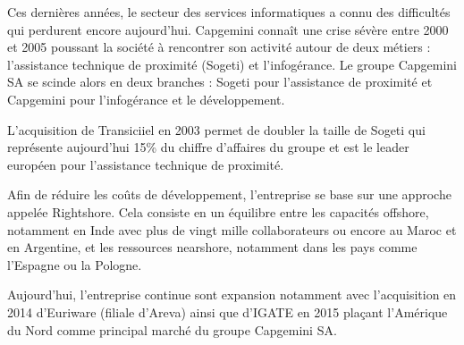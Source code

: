     Ces dernières années, le secteur des services informatiques a connu des difficultés qui perdurent encore aujourd'hui. Capgemini connaît une crise sévère entre 2000 et 2005 poussant la société à rencontrer son activité autour de deux métiers : l'assistance technique de proximité (Sogeti) et l'infogérance. Le groupe Capgemini SA se scinde alors en deux branches : Sogeti pour l'assistance de proximité et Capgemini pour l'infogérance et le développement.
    
    L'acquisition de Transiciiel en 2003 permet de doubler la taille de Sogeti qui représente aujourd'hui 15\% du chiffre d'affaires du groupe et est le leader européen pour l'assistance technique de proximité.
    
    Afin de réduire les coûts de développement, l'entreprise se base sur une approche appelée Rightshore. Cela consiste en un équilibre entre les capacités offshore, notamment en Inde avec plus de vingt mille collaborateurs ou encore au Maroc et en Argentine, et les ressources nearshore, notamment dans les pays comme l'Espagne ou la Pologne.
    
    Aujourd'hui, l'entreprise continue sont expansion notamment avec l'acquisition en 2014 d'Euriware (filiale d'Areva) ainsi que d'IGATE en 2015 plaçant l'Amérique du Nord comme principal marché du groupe Capgemini SA.